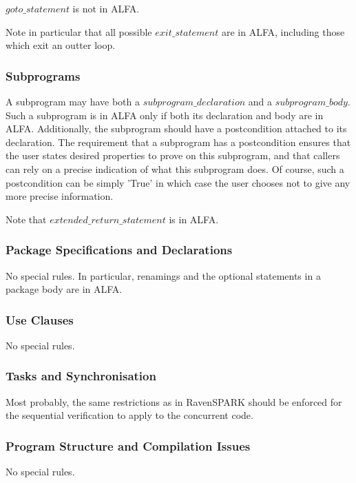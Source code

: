 \documentclass[fullpage]{article}
\newcommand{\bnf}[1]{$\mathit{#1}$}
\begin{document}
\noindent
\bnf{goto\_statement} is not in ALFA.

Note in particular that all possible \bnf{exit\_statement} are in ALFA,
including those which exit an outter loop.

\subsubsection{Subprograms}

A subprogram may have both a \bnf{subprogram\_declaration} and a
\bnf{subprogram\_body}. Such a subprogram is in ALFA only if both its
declaration and body are in ALFA. Additionally, the subprogram should have a
postcondition attached to its declaration. The requirement that a subprogram
has a postcondition ensures that the user states desired properties to prove on
this subprogram, and that callers can rely on a precise indication of what this
subprogram does. Of course, such a postcondition can be simply 'True' in which
case the user chooses not to give any more precise information.

Note that \bnf{extended\_return\_statement} is in ALFA.

\subsubsection{Package Specifications and Declarations}

No special rules. In particular, renamings and the optional statements in a
package body are in ALFA.

\subsubsection{Use Clauses}

No special rules.

\subsubsection{Tasks and Synchronisation}

Most probably, the same restrictions as in RavenSPARK should be enforced for
the sequential verification to apply to the concurrent code.

\subsubsection{Program Structure and Compilation Issues}

No special rules.
\end{document}
